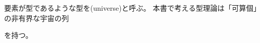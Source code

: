 \documentclass[index]{subfiles}
\begin{document}

要素が型であるような型を(universe)と呼ぶ。
本書で考える型理論は「可算個」の非有界な宇宙の列
\begin{myDisplayMath}
  \myUniverse{} \myElemOf
  \myUniverse{} \myElemOf
  \myUniverse{} \myElemOf
  \myDots
\end{myDisplayMath}
を持つ。
\end{document}
